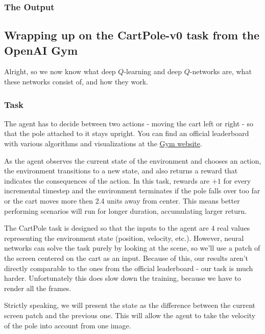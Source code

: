 \subsubsection{The Output}


\subsection{Wrapping up on the CartPole-v0 task from the OpenAI Gym}


Alright, so we now know what deep $Q$-learning and deep $Q$-networks are, what these 
networks consist of, and how they work.

\subsubsection{Task}

The agent has to decide between two actions - moving the cart left or right - so that 
the pole attached to it stays upright. You can find an official leaderboard with 
various algorithms and visualizations at the 
\href{https://www.gymlibrary.ml/environments/classic_control/cart_pole}{Gym website}.

As the agent observes the current state of the environment and chooses an action, the 
environment transitions to a new state, and also returns a reward that indicates the 
consequences of the action. In this task, rewards are $+1$ for every incremental 
timestep and the environment terminates if the pole falls over too far or the cart 
moves more then 2.4 units away from center. This means better performing scenarios 
will run for longer duration, accumulating larger return.

The CartPole task is designed so that the inputs to the agent are $4$ real values 
representing the environment state (position, velocity, etc.). However, neural 
networks can solve the task purely by looking at the scene, so we'll use a patch of 
the screen centered on the cart as an input. Because of this, our results aren't 
directly comparable to the ones from the official leaderboard - our task is much harder. 
Unfortunately this does slow down the training, because we have to render all the frames.

Strictly speaking, we will present the state as the difference between the current 
screen patch and the previous one. This will allow the agent to take the velocity of 
the pole into account from one image.

